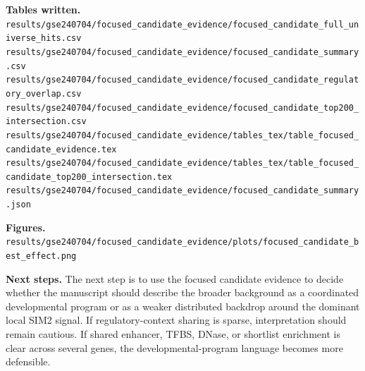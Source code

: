 \textbf{Tables written.}
\texttt{results/gse240704/focused\_candidate\_evidence/focused\_candidate\_full\_universe\_hits.csv}\\
\texttt{results/gse240704/focused\_candidate\_evidence/focused\_candidate\_summary.csv}\\
\texttt{results/gse240704/focused\_candidate\_evidence/focused\_candidate\_regulatory\_overlap.csv}\\
\texttt{results/gse240704/focused\_candidate\_evidence/focused\_candidate\_top200\_intersection.csv}\\
\texttt{results/gse240704/focused\_candidate\_evidence/tables\_tex/table\_focused\_candidate\_evidence.tex}\\
\texttt{results/gse240704/focused\_candidate\_evidence/tables\_tex/table\_focused\_candidate\_top200\_intersection.tex}\\
\texttt{results/gse240704/focused\_candidate\_evidence/focused\_candidate\_summary.json}

\textbf{Figures.}
\texttt{results/gse240704/focused\_candidate\_evidence/plots/focused\_candidate\_best\_effect.png}

\textbf{Next steps.}
The next step is to use the focused candidate evidence to decide whether the manuscript should describe the broader background as a coordinated developmental program or as a weaker distributed backdrop around the dominant local SIM2 signal. If regulatory-context sharing is sparse, interpretation should remain cautious. If shared enhancer, TFBS, DNase, or shortlist enrichment is clear across several genes, the developmental-program language becomes more defensible.
